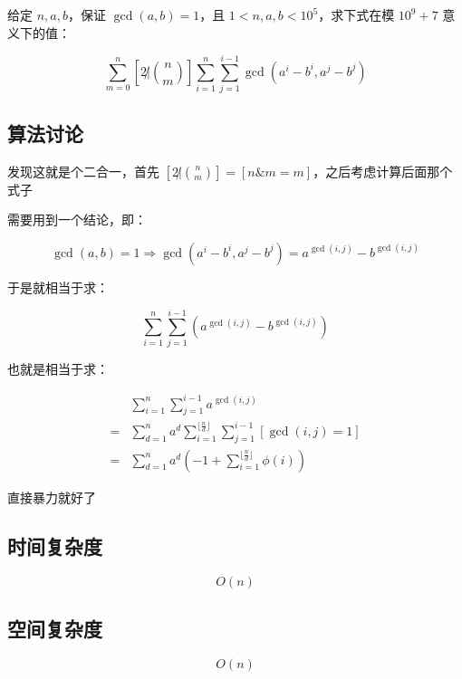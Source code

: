 \documentclass[UTF8]{article}
\begin{document}
给定 $n,a,b$，保证 $\gcd(a,b)=1$，且 $1 < n,a,b < 10^5$，求下式在模 $10^9+7$ 意义下的值：

$$
\sum_{m=0}^{n}[2 \not| {n \choose m}] \sum_{i=1}^{n}\sum_{j=1}^{i-1} \gcd(a^i-b^i,a^j-b^j)
$$

\subsection{算法讨论}

发现这就是个二合一，首先 $[2 \not| {n \choose m}]=[n \& m = m]$，之后考虑计算后面那个式子

需要用到一个结论，即：

$$
\gcd(a,b)=1 \Rightarrow \gcd(a^i-b^i,a^j-b^j)=a^{\gcd(i,j)}-b^{\gcd(i,j)}
$$

于是就相当于求：

$$
\sum_{i=1}^{n}\sum_{j=1}^{i-1}\left(a^{\gcd(i,j)}-b^{\gcd(i,j)}\right)
$$

也就是相当于求：

$$
\begin{aligned}
 &\sum_{i=1}^{n}\sum_{j=1}^{i-1}a^{\gcd(i,j)} \\
=&\sum_{d=1}^{n}a^d\sum_{i=1}^{\lfloor \frac{n}{d} \rfloor}\sum_{j=1}^{i-1}[\gcd(i,j)=1] \\
=&\sum_{d=1}^{n}a^d\left(-1+\sum_{i=1}^{\lfloor \frac{n}{d} \rfloor}\phi(i)\right)
\end{aligned}
$$

直接暴力就好了

\subsection{时间复杂度}

$$
O(n)
$$

\subsection{空间复杂度}

$$
O(n)
$$
\end{document}
